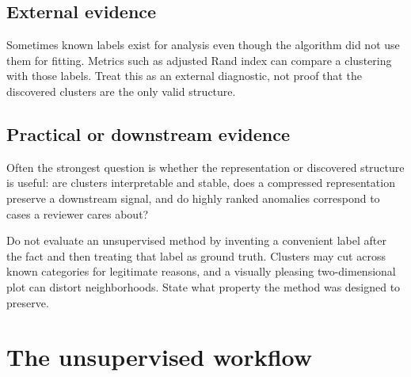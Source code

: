 \subsection{External evidence}
Sometimes known labels exist for analysis even though the algorithm did not use them for fitting. Metrics such as adjusted Rand index can compare a clustering with those labels. Treat this as an external diagnostic, not proof that the discovered clusters are the only valid structure.

\subsection{Practical or downstream evidence}
Often the strongest question is whether the representation or discovered structure is useful: are clusters interpretable and stable, does a compressed representation preserve a downstream signal, and do highly ranked anomalies correspond to cases a reviewer cares about?

\begin{pitfall}
Do not evaluate an unsupervised method by inventing a convenient label after the fact and then treating that label as ground truth. Clusters may cut across known categories for legitimate reasons, and a visually pleasing two-dimensional plot can distort neighborhoods. State what property the method was designed to preserve.
\end{pitfall}

\section{The unsupervised workflow}

\begin{mlfigure}
\end{mlfigure}

